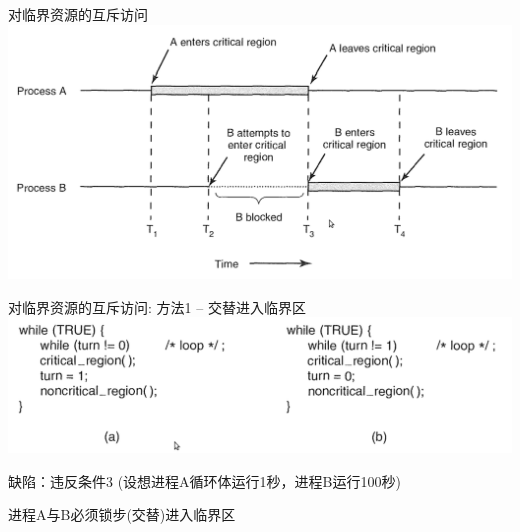 \documentclass[xcolor=svgnames]{beamer}
\begin{document}
\begin{CJK*}{UTF8}{gbsn}
\begin{frame}{对临界资源的互斥访问}
\includegraphics[width=1.0\textwidth]{mutual.png}
\end{frame}

\begin{frame}{对临界资源的互斥访问: 方法1 -- 交替进入临界区}
\includegraphics[width=1.0\textwidth]{alter.png}

缺陷：违反条件3 (设想进程A循环体运行1秒，进程B运行100秒)

进程A与B必须锁步(交替)进入临界区
\end{frame}


\end{CJK*}
\end{document}
